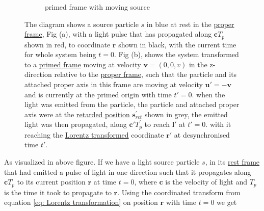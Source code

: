 \begin{figure}[H]
\begin{subfigure}{.49\textwidth}
		\caption{primed frame with moving source}
		\label{fig: primed frame 1}
	\end{subfigure}
	\caption{The diagram shows a source particle ${s}$ in blue at rest in the \protect\hyperlink{def-proper-frame}{proper frame}, Fig (a), with a light pulse that has propagated along $\mathbf{c} {T}_{p}$ shown in red, to coordinate $\mathbf{r}$ shown in black, with the current time for whole system being ${t} = 0$. Fig (b), shows the system transformed to a \protect\hyperlink{def-Primed-Frame}{primed frame} moving at velocity $\mathbf{v} = (0,0,v)$ in the z-direction relative to the \protect\hyperlink{def-proper-frame}{proper frame}, such that the particle and its attached proper axis in this frame are moving at velocity $\mathbf{u'} =-\mathbf{v}$ and is currently at the primed origin with time ${t{'}} = 0$. when the light was emitted from the particle, the particle and attached proper axis were at the \protect\hyperlink{def-retarded-position}{retarded position} $\mathbf{s}_{ret}^{'}$ shown in grey, the emitted light was then propagated, along $\mathbf{c}{'} {T}_{p}^{'}$ to reach $\mathbf{l}{'}$ at ${t{'}} = 0$. with it reaching the \protect\hyperlink{def-lorentz-transform}{Lorentz transformed} coordinate $\mathbf{r}{'}$ at desynchronised time $t'$.}
	\label{fig: appendix Retarded field outward field transform}
\end{figure}

As visualized in above figure.
If we have a light source particle ${s}$, in its \hyperlink{def-proper-frame}{rest frame} that had emitted a pulse of light in one direction such that it propagates along $\mathbf{c} {T}_{p}$ to its current position $\mathbf{r}$ at time ${t} = 0$, where $\mathbf{c}$ is the velocity of light and ${T}_{p}$ is the time it took to propagate to $\mathbf{r}$.
Using the coordinated transform from equation \eqref{eq: Lorentz transformation} on position $\mathbf{r}$ with time ${t} = 0$ we get


